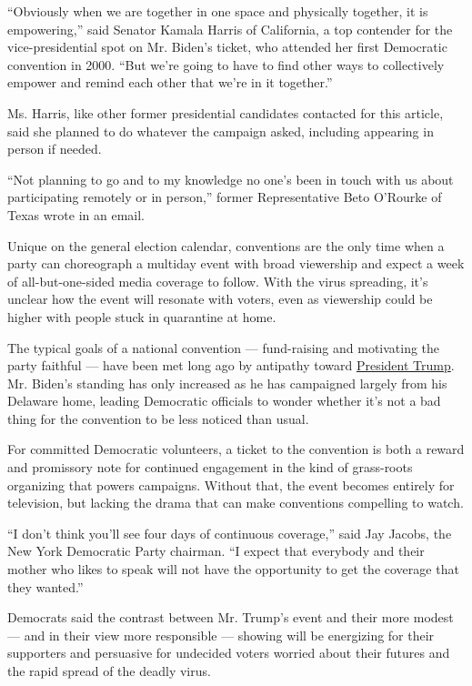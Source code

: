 ``Obviously when we are together in one space and physically together,
it is empowering,'' said Senator Kamala Harris of California, a top
contender for the vice-presidential spot on Mr. Biden's ticket, who
attended her first Democratic convention in 2000. ``But we're going to
have to find other ways to collectively empower and remind each other
that we're in it together.''

Ms. Harris, like other former presidential candidates contacted for this
article, said she planned to do whatever the campaign asked, including
appearing in person if needed.

``Not planning to go and to my knowledge no one's been in touch with us
about participating remotely or in person,'' former Representative Beto
O'Rourke of Texas wrote in an email.

Unique on the general election calendar, conventions are the only time
when a party can choreograph a multiday event with broad viewership and
expect a week of all-but-one-sided media coverage to follow. With the
virus spreading, it's unclear how the event will resonate with voters,
even as viewership could be higher with people stuck in quarantine at
home.

The typical goals of a national convention --- fund-raising and
motivating the party faithful --- have been met long ago by antipathy
toward
\href{https://www.nytimes.com/interactive/2020/us/elections/donald-trump.html}{President
Trump}. Mr. Biden's standing has only increased as he has campaigned
largely from his Delaware home, leading Democratic officials to wonder
whether it's not a bad thing for the convention to be less noticed than
usual.

For committed Democratic volunteers, a ticket to the convention is both
a reward and promissory note for continued engagement in the kind of
grass-roots organizing that powers campaigns. Without that, the event
becomes entirely for television, but lacking the drama that can make
conventions compelling to watch.

``I don't think you'll see four days of continuous coverage,'' said Jay
Jacobs, the New York Democratic Party chairman. ``I expect that
everybody and their mother who likes to speak will not have the
opportunity to get the coverage that they wanted.''

Democrats said the contrast between Mr. Trump's event and their more
modest --- and in their view more responsible --- showing will be
energizing for their supporters and persuasive for undecided voters
worried about their futures and the rapid spread of the deadly virus.

